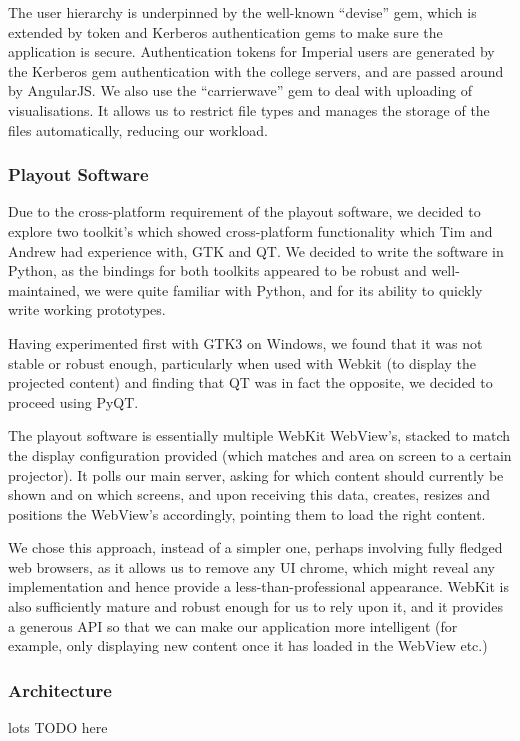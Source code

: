 \documentclass[a4paper, titlepage]{article}
\begin{document}
The user hierarchy is underpinned by the well-known ``devise'' gem, which is extended by token and 
Kerberos authentication gems to make sure the application is secure. Authentication tokens for Imperial 
users are generated by the Kerberos gem authentication with the college servers, and are passed around 
by AngularJS. We also use the ``carrierwave'' gem to deal with uploading of visualisations. It allows us
to restrict file types and manages the storage of the files automatically, reducing our workload. 

\subsubsection{Playout Software}
Due to the cross-platform requirement of the playout software, we decided to explore two toolkit's which showed cross-platform functionality which Tim and Andrew had experience with, GTK and QT. We decided to write the software in Python, as the bindings for both toolkits appeared to be robust and well-maintained, we were quite familiar with Python, and for its ability to quickly write working prototypes.

Having experimented first with GTK3 on Windows, we found that it was not stable or robust enough, particularly when used with Webkit (to display the projected content) and finding that QT was in fact the opposite, we decided to proceed using PyQT.

The playout software is essentially multiple WebKit WebView's, stacked to match the display configuration provided (which matches and area on screen to a certain projector). It polls our main server, asking for which content should currently be shown and on which screens, and upon receiving this data, creates, resizes and positions the WebView's accordingly, pointing them to load the right content.

We chose this approach, instead of a simpler one, perhaps involving fully fledged web browsers, as it allows us to remove any UI chrome, which might reveal any implementation and hence provide a less-than-professional appearance. WebKit is also sufficiently mature and robust enough for us to rely upon it, and it provides a generous API so that we can make our application more intelligent (for example, only displaying new content once it has loaded in the WebView etc.)

\subsubsection{Architecture} 
lots TODO here
\end{document}
